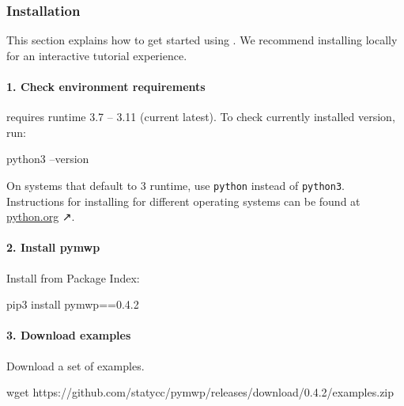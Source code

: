 \subsubsection{Installation}\label{guide-install}

This section explains how to get started using . We recommend
installing  locally for an interactive tutorial experience.

\paragraph*{1. Check environment requirements}

 requires  runtime 3.7 -- 3.11 (current latest).
To check currently installed version, run:

\begin{center}
\begin{minipage}{\textwidth}
\begin{cmdlisting}[label={lst:python-version}]
python3 --version
\end{cmdlisting}
\end{minipage}
\end{center}

On systems that default to  3 runtime, use \texttt{python} instead
of \texttt{python3}. Instructions for installing  for different
operating systems can be found at \href{https://python.org}{python.org} ↗.

\paragraph*{2. Install pymwp}
Install  from  Package Index:

\begin{center}
\begin{minipage}{\textwidth}
\begin{cmdlisting}[label={lst:install-cmd}]
pip3 install pymwp==0.4.2
\end{cmdlisting}
\end{minipage}
\end{center}

\paragraph*{3. Download examples}
Download a set of examples.

\begin{center}
\begin{minipage}{\textwidth}
\begin{cmdlisting}[label={lst:get-examples}]
wget https://github.com/statycc/pymwp/releases/download/0.4.2/examples.zip
\end{cmdlisting}
\end{minipage}
\end{center}

